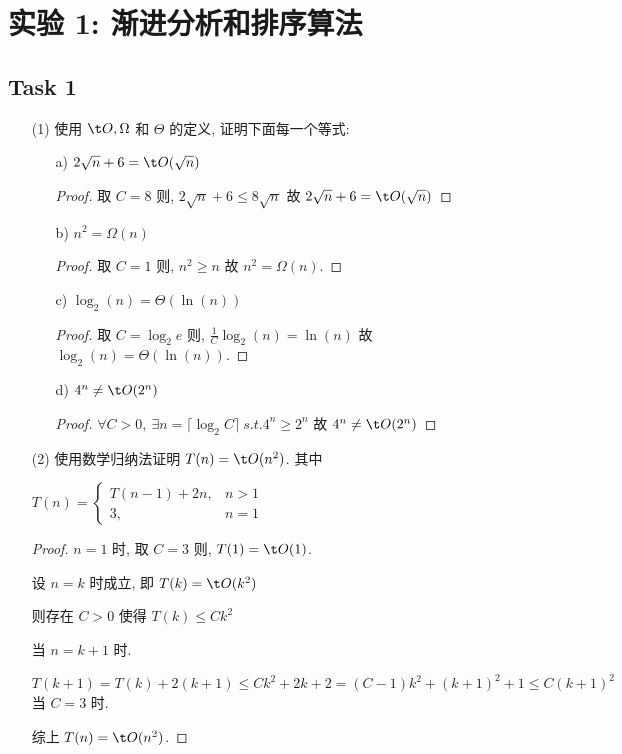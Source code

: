 \chapter{实验 1: 渐进分析和排序算法}
\section{Task 1}

\begin{itemize}
	\item[(1)] 使用 $\t O,\Omega$ 和 $\Theta$ 的定义, 证明下面每一个等式:
	\begin{itemize}
		\item[a)] $2\sqrt n + 6 = \t O(\sqrt n)$
		\begin{proof}
			取 $C=8$ 则, $2\sqrt n + 6 \leq 8\sqrt n$ 故 $2\sqrt n + 6 = \t O(\sqrt n)$
		\end{proof}
		\item[b)] $n^2=\Omega(n)$
		\begin{proof}
			取 $C=1$ 则, $n^2\geq n$ 故 $n^2=\Omega(n)$.
		\end{proof}
		\item[c)] $\log_2(n)=\Theta(\ln (n))$
		\begin{proof}
			取 $C=\log_2 e$ 则, $\frac 1 C \log_2 (n)=\ln (n)$
			故 $\log_2 (n)=\Theta(\ln (n))$.
		\end{proof}
		\item[d)] $4^n\neq \t O(2^n)$
		\begin{proof}
			$\forall C>0,\ \exists n=\lceil \log_2 C\rceil \ s.t. 4^n\geq 2^n$ 故 $4^n\neq \t O(2^n)$
		\end{proof}
	\end{itemize}
	\item[(2)] 使用数学归纳法证明 $T(n)=\t O(n^2)$. 其中
	
	$
	T(n)=\left\{
	\begin{aligned}
		T(n-1)+2n, & n>1 \\
		3, & n=1
	\end{aligned}
	\right.
	$
	\begin{proof}
		$n=1$ 时, 取 $C=3$ 则, $T(1)=\t O(1)$.
		
		设 $n=k$ 时成立, 即 $T(k)=\t O(k^2)$
		
		则存在 $C>0$ 使得 $T(k)\le Ck^2$
		
		当 $n=k+1$ 时.
		
		$T(k+1)=T(k)+2(k+1) \le Ck^2+2k+2 = (C-1)k^2+(k+1)^2 + 1 \le C(k+1)^2$ 当 $C=3$ 时.
		
		综上 $T(n)=\t O(n^2)$.
	\end{proof}
\end{itemize}

